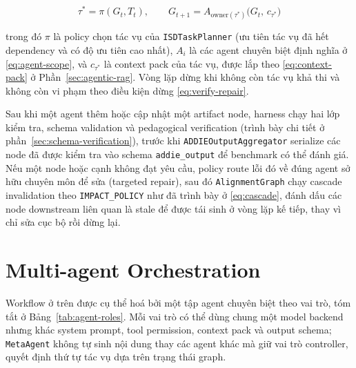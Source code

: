 \documentclass[../main.tex]{subfiles}
\begin{document}
\begin{equation}\label{eq:workflow-step}
\tau^* = \pi(G_t, T_t), \qquad G_{t+1} = A_{\mathrm{owner}(\tau^*)}\big(G_t,\, c_{\tau^*}\big)
\end{equation}

trong đó $\pi$ là policy chọn tác vụ của \texttt{ISDTaskPlanner} (ưu tiên tác vụ đã hết dependency và có độ ưu tiên cao nhất), $A_i$ là các agent chuyên biệt định nghĩa ở \eqref{eq:agent-scope}, và $c_{\tau^*}$ là context pack của tác vụ, được lắp theo \eqref{eq:context-pack} ở Phần~\ref{sec:agentic-rag}. Vòng lặp dừng khi không còn tác vụ khả thi và không còn vi phạm theo điều kiện dừng \eqref{eq:verify-repair}.

Sau khi một agent thêm hoặc cập nhật một artifact node, harness chạy hai lớp kiểm tra, schema validation và pedagogical verification (trình bày chi tiết ở phần~\ref{sec:schema-verification}), trước khi \texttt{ADDIEOutputAggregator} serialize các node đã được kiểm tra vào schema \texttt{addie\_output} để benchmark có thể đánh giá. Nếu một node hoặc cạnh không đạt yêu cầu, policy route lỗi đó về đúng agent sở hữu chuyên môn để sửa (targeted repair), sau đó \texttt{AlignmentGraph} chạy cascade invalidation theo \texttt{IMPACT\_POLICY} như đã trình bày ở \eqref{eq:cascade}, đánh dấu các node downstream liên quan là stale để được tái sinh ở vòng lặp kế tiếp, thay vì chỉ sửa cục bộ rồi dừng lại.

\section{Multi-agent Orchestration}

Workflow ở trên được cụ thể hoá bởi một tập agent chuyên biệt theo vai trò, tóm tắt ở Bảng~\ref{tab:agent-roles}. Mỗi vai trò có thể dùng chung một model backend nhưng khác system prompt, tool permission, context pack và output schema; \texttt{MetaAgent} không tự sinh nội dung thay các agent khác mà giữ vai trò controller, quyết định thứ tự tác vụ dựa trên trạng thái graph.
\end{document}
